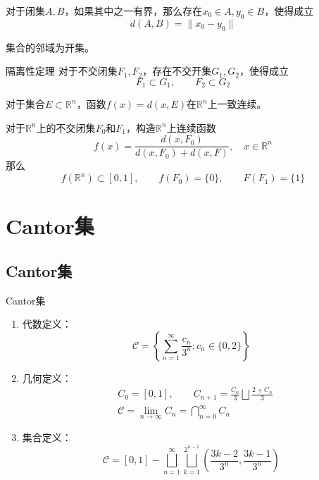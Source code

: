 \documentclass[lang = cn, scheme = chinese, thmcnt = section]{elegantbook}
\newcommand{\R}{\mathbb{R}}            %
\newcommand{\sub}{\subset}             %
\begin{document}
\begin{theorem}
	对于闭集$A,B$，如果其中之一有界，那么存在$x_0\in A,y_0\in B$，使得成立
	$$
	d(A,B)=\|x_0-y_0\|
	$$
\end{theorem}

\begin{theorem}
	集合的邻域为开集。
\end{theorem}

\begin{theorem}{隔离性定理}
	对于不交闭集$F_1,F_2$，存在不交开集$G_1,G_2$，使得成立
	$$
	F_1\sub G_1,\qquad
	F_2\sub G_2
	$$
\end{theorem}

\begin{exercise}
	对于集合$E\sub\R^n$，函数$f(x)=d(x,E)$在$\R^n$上一致连续。
\end{exercise}

\begin{exercise}
	对于$\R^n$上的不交闭集$F_0$和$F_1$，构造$\R^n$上连续函数%
	$$
	f(x)=\frac{d(x,F_0)}{d(x,F_0)+d(x,F)},\quad x\in\R^n
	$$
	那么%
	$$
	f(\R^n)\sub[0,1],\qquad 
	f(F_0)=\{0\},\qquad 
	F(F_1)=\{1\}
	$$
\end{exercise}

\section{Cantor集}

\subsection{Cantor集}

\begin{definition}{Cantor集}
	\begin{enumerate}
		\item 代数定义：
		$$
		\mathcal{C}=\left\{ \sum_{n=1}^{\infty}\frac{c_n}{3^n}
		: c_n\in\{0,2\}\right\}
		$$
		\item 几何定义：
		\begin{align*}
			&C_0=[0,1],\qquad C_{n+1}=\frac{C_n}{3}\bigsqcup\frac{2+C_n}{3}\\
			&\mathcal{C}=\lim_{n\to\infty}C_n=\bigcap_{n=0}^{\infty}C_n
		\end{align*}
		\item 集合定义：%
		$$
		\mathcal{C}=[0,1]-\bigsqcup_{n=1}^{\infty}\bigsqcup_{k=1}^{2^{n-1}}\left(\frac{3k-2}{3^n},\frac{3k-1}{3^n}\right)
		$$
	\end{enumerate}
\end{definition}
\end{document}
